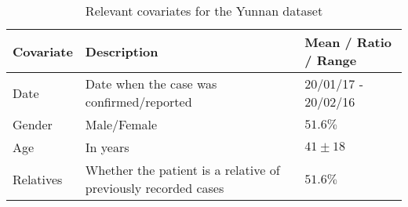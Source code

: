 \begin{table}
	\begin{tabularx}{\linewidth}{XXX}
		\hline
		\textbf{Covariate} & \textbf{Description} & \textbf{Mean / Ratio / Range}\\
		\hline
		Date & Date when the case was confirmed/reported & 20/01/17 - 20/02/16\\
		Gender & Male/Female & $51.6\%$ \\
		Age & In years & $41\pm18$ \\
		Relatives & Whether the patient is a relative of previously recorded cases & $51.6\%$ \\
		\hline
	\end{tabularx}
	\caption{Relevant covariates for the Yunnan dataset}
	\label{tab:yunnan_covariates}
\end{table}

